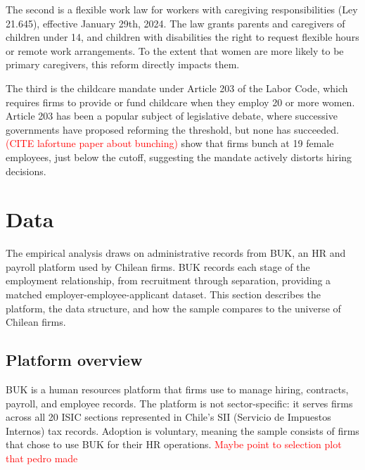 \documentclass[11pt]{article}
\begin{document}
The second is a flexible work law for workers with caregiving responsibilities (Ley 21.645), effective January 29th, 2024. The law grants parents and caregivers of children under 14, and children with disabilities the right to request flexible hours or remote work arrangements. To the extent that women are more likely to be primary caregivers, this reform directly impacts them. %

The third is the childcare mandate under Article 203 of the Labor Code, which requires firms to provide or fund childcare when they employ 20 or more women. Article 203 has been a popular subject of legislative debate, where successive governments have proposed reforming the threshold, but none has succeeded. \textcolor{red}{(CITE lafortune paper about bunching)} show that firms bunch at 19 female employees, just below the cutoff, suggesting the mandate actively distorts hiring decisions.


\section{Data}

The empirical analysis draws on administrative records from BUK, an HR and payroll platform used by Chilean firms. BUK records each stage of the employment relationship, from recruitment through separation, providing a matched employer-employee-applicant dataset. This section describes the platform, the data structure, and how the sample compares to the universe of Chilean firms.

\subsection{Platform overview}

BUK is a human resources platform that firms use to manage hiring, contracts, payroll, and employee records. The platform is not sector-specific: it serves firms across all 20 ISIC sections represented in Chile's SII (Servicio de Impuestos Internos) tax records. Adoption is voluntary, meaning the sample consists of firms that chose to use BUK for their HR operations. \textcolor{red}{Maybe point to selection plot that pedro made}
\end{document}
